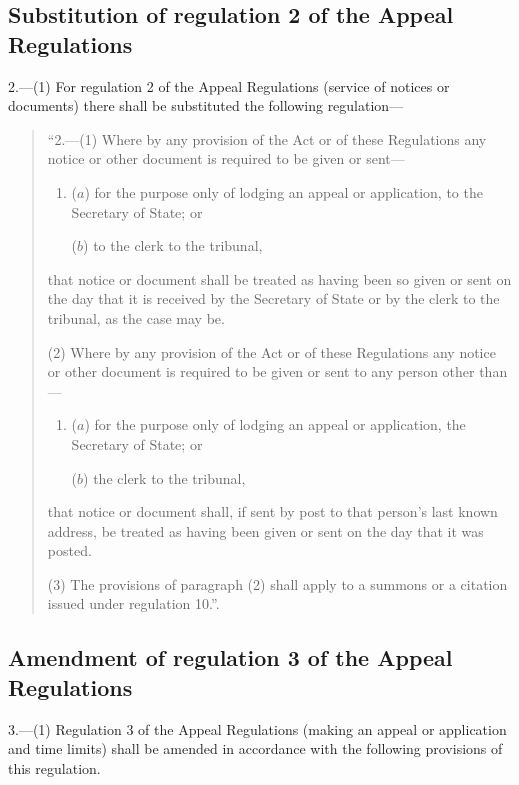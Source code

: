 \documentclass[12pt,a4paper]{article}
\begin{document}
\subsection[2. Substitution of regulation 2 of the Appeal Regulations]{Substitution of regulation 2 of the Appeal Regulations}

2.—(1) For regulation 2 of the Appeal Regulations (service of notices or documents) there shall be substituted the following regulation—
\begin{quotation}
“2.—(1) Where by any provision of the Act or of these Regulations any notice or other document is required to be given or sent—
\begin{enumerate}\item[]
($a$) for the purpose only of lodging an appeal or application, to the Secretary of State; or

($b$) to the clerk to the tribunal,
\end{enumerate}
that notice or document shall be treated as having been so given or sent on the day that it is received by the Secretary of State or by the clerk to the tribunal, as the case may be.

(2) Where by any provision of the Act or of these Regulations any notice or other document is required to be given or sent to any person other than—
\begin{enumerate}\item[]
($a$) for the purpose only of lodging an appeal or application, the Secretary of State; or

($b$) the clerk to the tribunal,
\end{enumerate}
that notice or document shall, if sent by post to that person’s last known address, be treated as having been given or sent on the day that it was posted.

(3) The provisions of paragraph (2) shall apply to a summons or a citation issued under regulation 10.”.
\end{quotation}

\subsection[3. Amendment of regulation 3 of the Appeal Regulations]{Amendment of regulation 3 of the Appeal Regulations}

3.—(1) Regulation 3 of the Appeal Regulations (making an appeal or application and time limits) shall be amended in accordance with the following provisions of this regulation.
\end{document}
